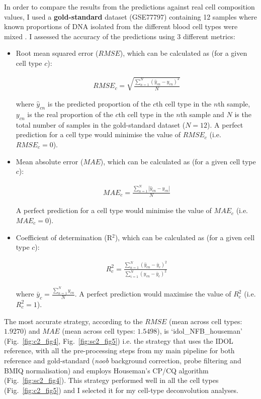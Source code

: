In order to compare the results from the predictions against real cell composition values, I used a \textbf{gold-standard} dataset (GSE77797) containing 12 samples where known proportions of DNA isolated from the different blood cell types were mixed \cite{Koestler2016}. I assessed the accuracy of the predictions using 3 different metrics:

\begin{itemize}
	
	\item Root mean squared error ($RMSE$), which can be calculated as (for a given cell type $c$):
	
	\begin{align}
	RMSE_c = \sqrt{\frac{\sum_{n=1}^{N} (\hat{y}_{cn} - y_{cn})^2}{N}}
	\end{align}
	
	where $\hat{y}_{cn}$ is the predicted proportion of the $c$th cell type in the $n$th sample, $y_{cn}$ is the real proportion of the $c$th cell type in the $n$th sample and $N$ is the total number of samples in the gold-standard dataset ($N=12$). A perfect prediction for a cell type would minimise the value of $RMSE_c$ (i.e. $RMSE_c = 0$).
	
	\item Mean absolute error ($MAE$), which can be calculated as (for a given cell type $c$):
	
	\begin{align}
	MAE_c = \frac{\sum_{n=1}^{N} |\hat{y}_{cn} - y_{cn}|}{N}
	\end{align}
	
	A perfect prediction for a cell type would minimise the value of $MAE_c$ (i.e. $MAE_c = 0$).
	
	\item Coefficient of determination (R$^2$), which can be calculated as (for a given cell type $c$):
	
	\begin{align}
	R^2_c = \frac{\sum_{n=1}^{N} (\hat{y}_{cn} - \bar{y}_c)^2}{\sum_{i=1}^{N} (y_{cn} - \bar{y}_c)^2}
	\end{align}
	
	where $\bar{y}_c = \frac{\sum_{n=1}^{N} y_{cn}}{N}$. A perfect prediction would maximise the value of $R^2_c$ (i.e. $R^2_c=1$).
	
\end{itemize}


The most accurate strategy, according to the $RMSE$ (mean across cell types: $1.9270$) and $MAE$ (mean across cell types: $1.5498$), is `idol\_NFB\_houseman' (Fig.~\ref{fig:c2_fig4}, Fig.~\ref{fig:sc2_fig5}) i.e. the strategy that uses the IDOL reference, with all the pre-processing steps from my main pipeline for both reference and gold-standard (\textit{noob} background correction, probe filtering and BMIQ normalisation) and employs Houseman's CP/CQ algorithm (Fig.~\ref{fig:sc2_fig4}). This strategy performed well in all the cell types (Fig.~\ref{fig:c2_fig5}) and I selected it for my cell-type deconvolution analyses. 

